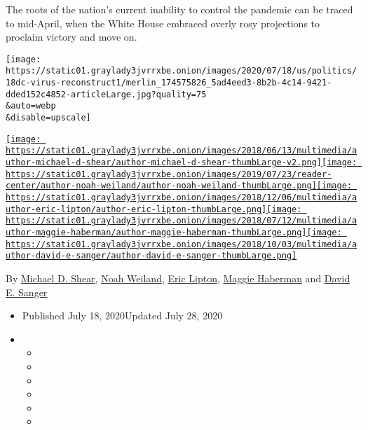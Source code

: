 The roots of the nation's current inability to control the pandemic can
be traced to mid-April, when the White House embraced overly rosy
projections to proclaim victory and move on.

\texttt{[image: https://static01.graylady3jvrrxbe.onion/images/2020/07/18/us/politics/18dc-virus-reconstruct1/merlin\_174575826\_5ad4eed3-8b2b-4c14-9421-dded152c4852-articleLarge.jpg?quality=75\\\&auto=webp\\\&disable=upscale]}

\href{https://www.nytimes3xbfgragh.onion/by/michael-d-shear}{\texttt{[image: https://static01.graylady3jvrrxbe.onion/images/2018/06/13/multimedia/author-michael-d-shear/author-michael-d-shear-thumbLarge-v2.png]}}\href{https://www.nytimes3xbfgragh.onion/by/noah-weiland}{\texttt{[image: https://static01.graylady3jvrrxbe.onion/images/2019/07/23/reader-center/author-noah-weiland/author-noah-weiland-thumbLarge.png]}}\href{https://www.nytimes3xbfgragh.onion/by/eric-lipton}{\texttt{[image: https://static01.graylady3jvrrxbe.onion/images/2018/12/06/multimedia/author-eric-lipton/author-eric-lipton-thumbLarge.png]}}\href{https://www.nytimes3xbfgragh.onion/by/maggie-haberman}{\texttt{[image: https://static01.graylady3jvrrxbe.onion/images/2018/07/12/multimedia/author-maggie-haberman/author-maggie-haberman-thumbLarge.png]}}\href{https://www.nytimes3xbfgragh.onion/by/david-e-sanger}{\texttt{[image: https://static01.graylady3jvrrxbe.onion/images/2018/10/03/multimedia/author-david-e-sanger/author-david-e-sanger-thumbLarge.png]}}

By \href{https://www.nytimes3xbfgragh.onion/by/michael-d-shear}{Michael
D. Shear},
\href{https://www.nytimes3xbfgragh.onion/by/noah-weiland}{Noah Weiland},
\href{https://www.nytimes3xbfgragh.onion/by/eric-lipton}{Eric Lipton},
\href{https://www.nytimes3xbfgragh.onion/by/maggie-haberman}{Maggie
Haberman} and
\href{https://www.nytimes3xbfgragh.onion/by/david-e-sanger}{David E.
Sanger}

\begin{itemize}
\item
  Published July 18, 2020Updated July 28, 2020
\item
  \begin{itemize}
  \item
  \item
  \item
  \item
  \item
  \item
  \end{itemize}
\end{itemize}

